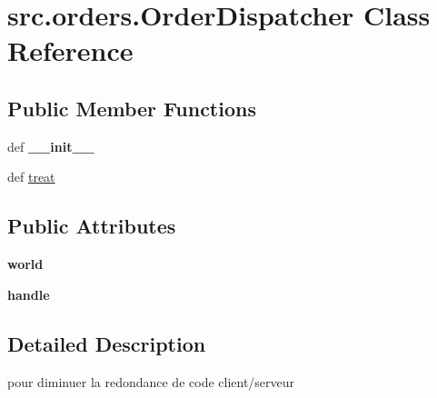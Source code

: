 \hypertarget{classsrc_1_1orders_1_1_order_dispatcher}{\section{src.\-orders.\-Order\-Dispatcher \-Class \-Reference}
\label{classsrc_1_1orders_1_1_order_dispatcher}
}
\subsection*{\-Public \-Member \-Functions}
\begin{DoxyCompactItemize}
\item 
\hypertarget{classsrc_1_1orders_1_1_order_dispatcher_a72be66c7756e667e0f48da3feb526db8}{def {\bfseries \-\_\-\-\_\-init\-\_\-\-\_\-}}\label{classsrc_1_1orders_1_1_order_dispatcher_a72be66c7756e667e0f48da3feb526db8}

\item 
def \hyperlink{classsrc_1_1orders_1_1_order_dispatcher_af7e1d2ad1021e105f8a810e45163a2a6}{treat}
\end{DoxyCompactItemize}
\subsection*{\-Public \-Attributes}
\begin{DoxyCompactItemize}
\item 
\hypertarget{classsrc_1_1orders_1_1_order_dispatcher_a3e1eb5983064b2b581cfbe29e5d8d4a4}{{\bfseries world}}\label{classsrc_1_1orders_1_1_order_dispatcher_a3e1eb5983064b2b581cfbe29e5d8d4a4}

\item 
\hypertarget{classsrc_1_1orders_1_1_order_dispatcher_af3a628629fdbcc412086c3a2ad36263f}{{\bfseries handle}}\label{classsrc_1_1orders_1_1_order_dispatcher_af3a628629fdbcc412086c3a2ad36263f}

\end{DoxyCompactItemize}


\subsection{\-Detailed \-Description}
\begin{DoxyVerb}pour diminuer la redondance de code client/serveur \end{DoxyVerb}
 

